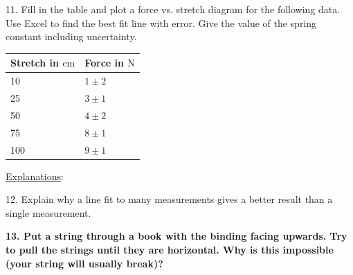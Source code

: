 11. Fill in the table and plot a force vs. stretch diagram for the following data. Use Excel to find the best fit line with error. Give the value of the spring constant including uncertainty.
\begin{table}[h]
    \centering
    \begin{tabular}{|l|l|}
        \hline
        Stretch in $\mathrm{cm}$ & Force in $\mathrm{N}$ \\ \hline
        10 & $1\pm 2$ \\ \hline
        25 & $3\pm 1$ \\ \hline
        50 & $4\pm 2$ \\ \hline
        75 & $8\pm 1$ \\ \hline
        100 & $9\pm 1$ \\ \hline
    \end{tabular}
\end{table}

\noindent \underline{Explanations}:\myskip

12. Explain why a line fit to many measurements gives a better result than a single measurement. \myskip

{\bf{13. Put a string through a book with the binding facing upwards. Try to pull the strings until they are horizontal.  Why is this impossible (your string will usually break)?}}
\newpage
\thispagestyle{plain}
